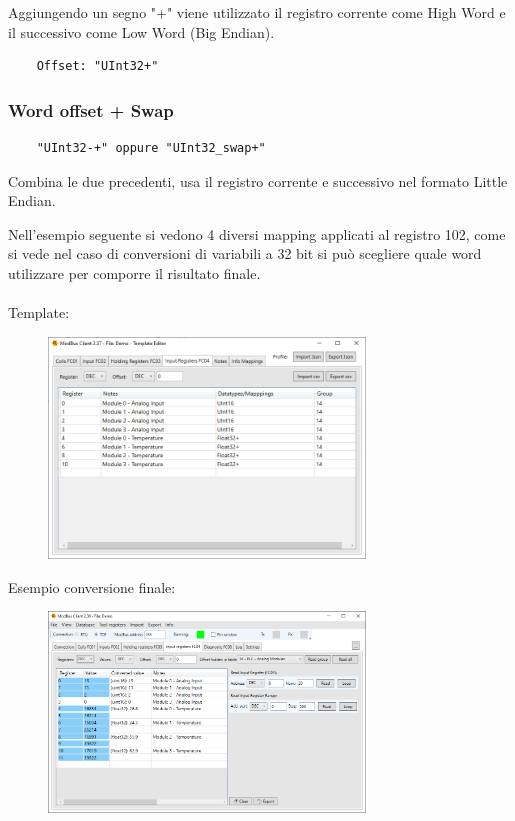 Aggiungendo un segno "+" viene utilizzato il registro corrente come High Word e il successivo
come Low Word (Big Endian).

\begin{verbatim}
    Offset: "UInt32+"
\end{verbatim}

\subsubsection{Word offset + Swap}

\begin{verbatim}
    "UInt32-+" oppure "UInt32_swap+"
\end{verbatim}

Combina le due precedenti, usa il registro corrente e successivo nel formato Little Endian.

\newpage

Nell'esempio seguente si vedono 4 diversi mapping applicati al registro 102, come si vede nel caso
di conversioni di variabili a 32 bit si può scegliere quale word utilizzare per comporre il risultato
finale.
\\\\
Template:

\begin{figure}[H]
\centering
\includegraphics[width=0.75\textwidth]{../Img/Modbus_Client_Template_00.PNG}
\caption{}
\end{figure}

Esempio conversione finale:

\begin{figure}[H]
\centering
\includegraphics[width=0.75\textwidth]{../Img/ModBus_Client_Template_ReadDemo00.PNG}
\caption{}
\end{figure}
